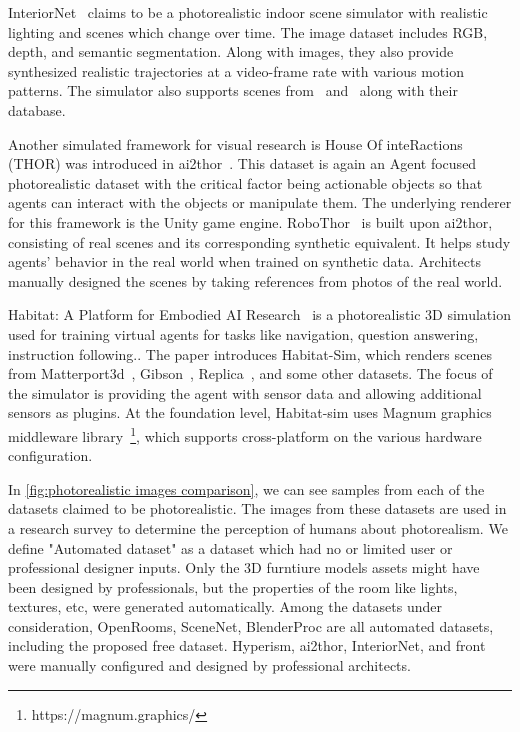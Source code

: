 InteriorNet~\cite{InteriorNet18} claims to be a photorealistic indoor scene simulator with realistic lighting and scenes which change over time.
The image dataset includes RGB, depth, and semantic segmentation.
Along with images, they also provide synthesized realistic trajectories at a video-frame rate with various motion patterns.
The simulator also supports scenes from~\cite{McCormac:etal:ICCV2017} and~\cite{Song2017SemanticSC} along with their database.

Another simulated framework for visual research is House Of inteRactions (THOR) was introduced in \gls{ai2thor}~\cite{kolve2019ai2thor}.
This dataset is again an Agent focused photorealistic dataset with the critical factor being actionable objects so that agents can interact with the objects or manipulate them.
The underlying renderer for this framework is the Unity game engine.
RoboThor~\cite{Deitke2020RoboTHORAO} is built upon \gls{ai2thor}, consisting of real scenes and its corresponding synthetic equivalent.
It helps study agents' behavior in the real world when trained on synthetic data.
Architects manually designed the scenes by taking references from photos of the real world.

Habitat: A Platform for Embodied AI Research~\cite{savva2019habitat} is a photorealistic 3D simulation used for training virtual agents for tasks like navigation, question answering, instruction following..
The paper introduces Habitat-Sim, which renders scenes from Matterport3d~\cite{chang2017matterport3d}, Gibson~\cite{xia2018gibson}, Replica~\cite{Straub2019TheRD}, and some other datasets.
The focus of the simulator is providing the agent with sensor data and allowing additional sensors as plugins.
At the foundation level, Habitat-sim uses Magnum graphics
middleware library~\footnote{https://magnum.graphics/}, which supports cross-platform on the various hardware configuration.

In \autoref{fig:photorealistic images comparison}, we can see samples from each of the datasets claimed to be photorealistic.
The images from these datasets are used in a research survey to determine the perception of humans about photorealism.
We define "Automated dataset" as a dataset which had no or limited user or professional designer inputs.
Only the 3D furntiure models assets might have been designed by professionals, but the properties of the room like lights, textures, etc, were generated automatically.
Among the datasets under consideration,
OpenRooms, SceneNet, BlenderProc are all automated datasets, including the proposed \gls{free} dataset.
Hyperism, \gls{ai2thor}, InteriorNet, and \gls{front} were manually configured and designed by professional architects.


